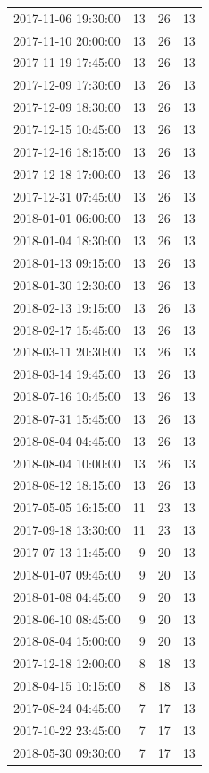 \begin{tabular}{lrrr}
2017-11-06 19:30:00 & 13 & 26 & 13 \\
2017-11-10 20:00:00 & 13 & 26 & 13 \\
2017-11-19 17:45:00 & 13 & 26 & 13 \\
2017-12-09 17:30:00 & 13 & 26 & 13 \\
2017-12-09 18:30:00 & 13 & 26 & 13 \\
2017-12-15 10:45:00 & 13 & 26 & 13 \\
2017-12-16 18:15:00 & 13 & 26 & 13 \\
2017-12-18 17:00:00 & 13 & 26 & 13 \\
2017-12-31 07:45:00 & 13 & 26 & 13 \\
2018-01-01 06:00:00 & 13 & 26 & 13 \\
2018-01-04 18:30:00 & 13 & 26 & 13 \\
2018-01-13 09:15:00 & 13 & 26 & 13 \\
2018-01-30 12:30:00 & 13 & 26 & 13 \\
2018-02-13 19:15:00 & 13 & 26 & 13 \\
2018-02-17 15:45:00 & 13 & 26 & 13 \\
2018-03-11 20:30:00 & 13 & 26 & 13 \\
2018-03-14 19:45:00 & 13 & 26 & 13 \\
2018-07-16 10:45:00 & 13 & 26 & 13 \\
2018-07-31 15:45:00 & 13 & 26 & 13 \\
2018-08-04 04:45:00 & 13 & 26 & 13 \\
2018-08-04 10:00:00 & 13 & 26 & 13 \\
2018-08-12 18:15:00 & 13 & 26 & 13 \\
2017-05-05 16:15:00 & 11 & 23 & 13 \\
2017-09-18 13:30:00 & 11 & 23 & 13 \\
2017-07-13 11:45:00 & 9 & 20 & 13 \\
2018-01-07 09:45:00 & 9 & 20 & 13 \\
2018-01-08 04:45:00 & 9 & 20 & 13 \\
2018-06-10 08:45:00 & 9 & 20 & 13 \\
2018-08-04 15:00:00 & 9 & 20 & 13 \\
2017-12-18 12:00:00 & 8 & 18 & 13 \\
2018-04-15 10:15:00 & 8 & 18 & 13 \\
2017-08-24 04:45:00 & 7 & 17 & 13 \\
2017-10-22 23:45:00 & 7 & 17 & 13 \\
2018-05-30 09:30:00 & 7 & 17 & 13 \\

\end{tabular}
